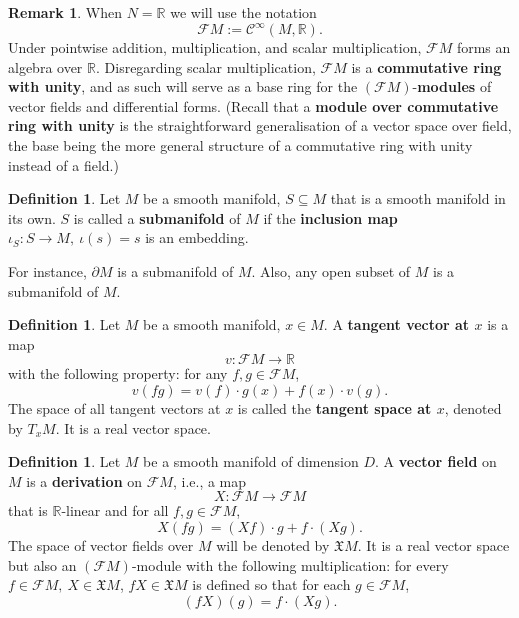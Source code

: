 \documentclass{elsarticle}
\theoremstyle{definition}
\newtheorem{definition}[theorem]{Definition}
\newtheorem{remark}[theorem]{Remark}
\newcommand{\R}{\mathbb{R}}
\newcommand{\newterm}[1]{\textbf{#1}}
\begin{document}
\begin{remark}
  When $N = \R$ we will use the notation
  \begin{equation}
    \mathcal{F} M := \mathcal{C}^\infty(M, \R).
  \end{equation}
  Under pointwise addition, multiplication, and scalar multiplication, $\mathcal{F} M$ forms an algebra over $\R$.
  Disregarding scalar multiplication, $\mathcal{F} M$ is a \newterm{commutative ring with unity}, and as such will serve as a base ring for the $(\mathcal{F} M)$-\newterm{modules} of vector fields and differential forms.
  (Recall that a \newterm{module over commutative ring with unity} is the straightforward generalisation of a vector space over field, the base being the more general structure of a commutative ring with unity instead of a field.)
\end{remark}
\begin{definition}
  Let $M$ be a smooth manifold, $S \subseteq M$ that is a smooth manifold in its own.
  $S$ is called a \newterm{submanifold} of $M$ if the \newterm{inclusion map} $\iota_S \colon S \to M,\ \iota(s) = s$ is an embedding.

  For instance, $\partial M$ is a submanifold of $M$.
  Also, any open subset of $M$ is a submanifold of $M$.
\end{definition}
\begin{definition}
  Let $M$ be a smooth manifold, $x \in M$.
  A \newterm{tangent vector at $x$} is a map
  \begin{equation}
    v \colon \mathcal{F} M \to \R
  \end{equation}
  with the following property: for any $f, g \in \mathcal{F} M$,
  \begin{equation}
    v(f g) = v(f) \cdot g(x) + f(x) \cdot v(g).
  \end{equation}
  The space of all tangent vectors at $x$ is called the \newterm{tangent space at $x$}, denoted by $T_x M$.
  It is a real vector space.
\end{definition}
\begin{definition}
  Let $M$ be a smooth manifold of dimension $D$.
  A \newterm{vector field} on $M$ is a \newterm{derivation} on $\mathcal{F} M$, i.e., a map
  \begin{equation}
    X \colon \mathcal{F} M \to \mathcal{F} M
  \end{equation}
  that is $\R$-linear and for all $f, g \in \mathcal{F} M$,
  \begin{equation}
    X(f g) = (X f) \cdot g + f \cdot (X g).
  \end{equation}
  The space of vector fields over $M$ will be denoted by $\mathfrak{X} M$.
  It is a real vector space but also an $(\mathcal{F} M)$-module with the following multiplication: for every $f \in \mathcal{F} M,\ X \in \mathfrak{X} M$, $f X \in \mathfrak{X} M$ is defined so that for each $g \in \mathcal{F} M$,
  \begin{equation}
    (f X)(g) = f \cdot (X g).
  \end{equation}
\end{definition}
\end{document}
